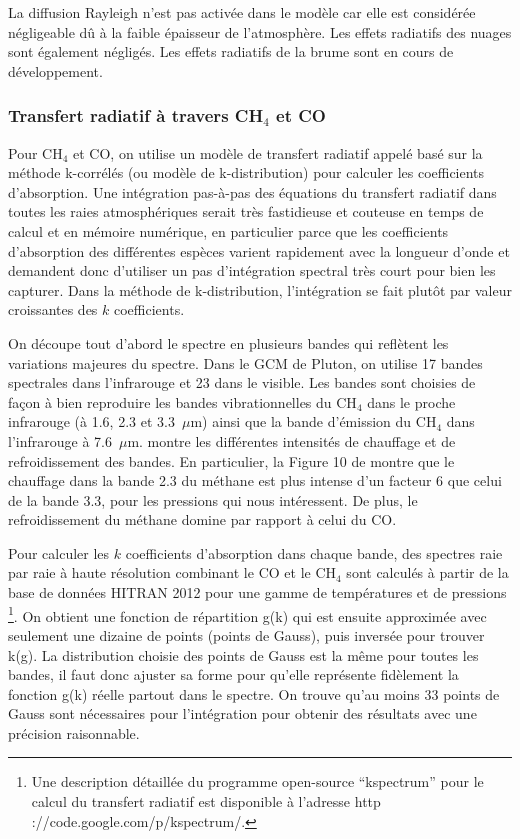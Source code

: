 La diffusion Rayleigh n’est pas activée dans le modèle car elle est considérée négligeable dû à la faible épaisseur de l’atmosphère. Les effets radiatifs des nuages sont également négligés. Les effets radiatifs de la brume sont en cours de développement. 

\subsubsection{Transfert radiatif à travers CH$_4$ et CO}

Pour CH$_4$ et CO, on utilise un modèle de transfert radiatif appelé basé sur la méthode k-corrélés (ou modèle de k-distribution) pour calculer les coefficients d’absorption. Une intégration pas-à-pas des équations du transfert radiatif dans toutes les raies atmosphériques serait très fastidieuse et couteuse en temps de calcul et en mémoire numérique, en particulier parce que les coefficients d'absorption des différentes espèces varient rapidement avec la longueur d'onde et demandent donc d’utiliser un pas d'intégration spectral très court pour bien les capturer. Dans la méthode de k-distribution, l’intégration se fait plutôt par valeur croissantes des $k$ coefficients.

On découpe tout d’abord le spectre en plusieurs bandes qui reflètent les variations majeures du spectre. Dans le GCM de Pluton, on utilise 17 bandes spectrales dans l’infrarouge et 23 dans le visible. Les bandes sont choisies de façon à bien reproduire les bandes vibrationnelles du CH$_4$ dans le proche infrarouge (à 1.6, 2.3 et 3.3~$\mu$m) ainsi que la bande d’émission du CH$_4$  dans l’infrarouge à  7.6~$\mu$m. \citet{Stro:96} montre les différentes intensités de chauffage et de refroidissement des bandes. En particulier, la Figure 10 de \citet{Stro:96} montre que le chauffage dans la bande 2.3 du méthane est plus intense d'un facteur 6 que celui de la bande 3.3, pour les pressions qui nous intéressent. De plus, le refroidissement du méthane domine par rapport à celui du CO.

Pour calculer les $k$ coefficients d’absorption dans chaque bande, des spectres raie par raie à haute résolution combinant le CO et le CH$_4$ sont calculés à partir de la base de données HITRAN 2012 pour une gamme de températures et de pressions \footnote{Une description détaillée du programme open-source ``kspectrum'' pour le calcul du transfert radiatif est disponible à l’adresse http ://code.google.com/p/kspectrum/.}. On obtient une fonction de répartition g(k) qui est ensuite approximée avec seulement une dizaine de points (points de Gauss), puis inversée pour trouver k(g). La distribution choisie des points de Gauss est la même pour toutes les bandes, il faut donc ajuster sa forme pour qu'elle représente fidèlement la fonction g(k) réelle partout dans le spectre. On trouve qu’au moins 33 points de Gauss sont nécessaires pour l’intégration pour obtenir des résultats avec une précision raisonnable. 

